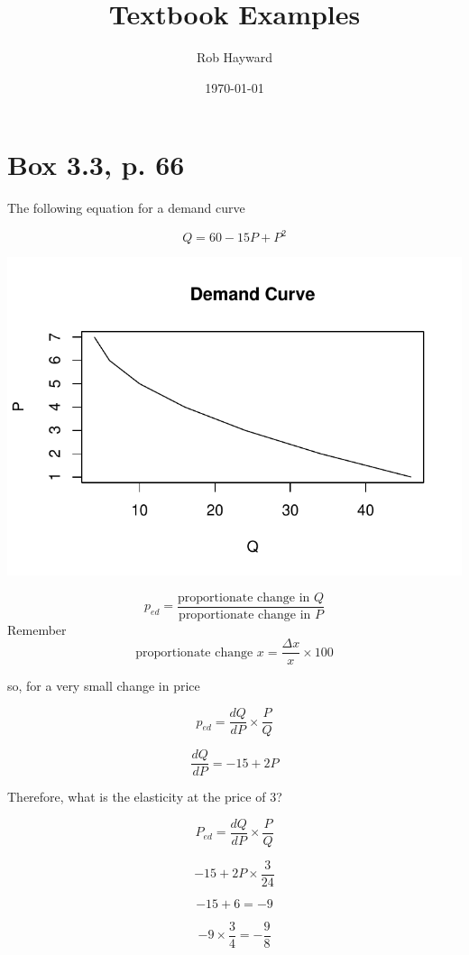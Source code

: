 \documentclass[12pt, a4paper, oneside]{article}\usepackage[]{graphicx}\usepackage[]{color}
\makeatletter
\def\maxwidth{ %
  \ifdim\Gin@nat@width>\linewidth
    \linewidth
  \else
    \Gin@nat@width
  \fi
}
\newenvironment{knitrout}{}{} %
\makeatother
\begin{document}
\title{Textbook Examples}
\author{Rob Hayward} 
\date{\today}
\maketitle
\section{Box 3.3, p. 66}

The following equation for a demand curve

$$Q = 60 - 15P + P^2$$

\begin{knitrout}
\color{fgcolor}
\includegraphics[width=\maxwidth]{figure/table} 

\end{knitrout}

$$p_{ed} = \frac{\text{proportionate change in } Q}{\text{proportionate change in } P}$$
Remember 
$$\text{proportionate change } x = \frac{\Delta x}{x} \times 100$$

so, for a very small change in price 

$$p_{ed} = \frac{dQ}{dP} \times \frac{P}{Q}$$

$$\frac{dQ}{dP} = -15 + 2P$$

Therefore, what is the elasticity at the price of 3? 

$$P_{ed} = \frac{dQ}{dP} \times \frac{P}{Q}$$

$$-15 + 2P \times \frac{3}{24}$$

$$ -15 + 6 = -9$$

$$ -9 \times \frac{3}{4} = -\frac{9}{8}$$
\end{document}
